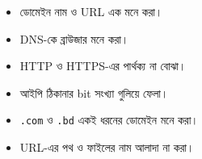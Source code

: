 \par\noindent
\begin{minipage}[t]{.48\linewidth}\vspace{0pt}
\begin{itemize}
\item ডোমেইন নাম ও URL এক মনে করা।
\item DNS-কে ব্রাউজার মনে করা।
\item HTTP ও HTTPS-এর পার্থক্য না বোঝা।
\end{itemize}
\end{minipage}\hfill
\begin{minipage}[t]{.48\linewidth}\vspace{0pt}
\begin{itemize}
\item আইপি ঠিকানার bit সংখ্যা গুলিয়ে ফেলা।
\item \texttt{.com} ও \texttt{.bd} একই ধরনের ডোমেইন মনে করা।
\item URL-এর পথ ও ফাইলের নাম আলাদা না করা।
\end{itemize}
\end{minipage}\par



